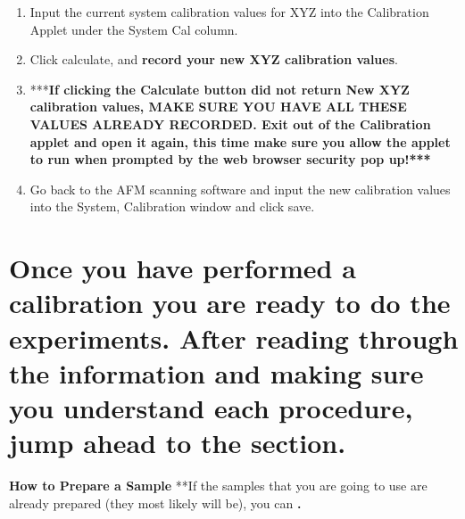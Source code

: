 \documentclass{../lab}
\begin{document}
\begin{enumerate}
\begin{itemize}
    \end{itemize}

    \item Input the current system calibration values for XYZ into the Calibration Applet under the System Cal column.

    \item Click calculate, and \textbf{record your new XYZ calibration values}.

    \item ***\textbf{If clicking the Calculate button did not return New XYZ calibration values, MAKE SURE YOU HAVE ALL THESE VALUES ALREADY RECORDED.  Exit out of the Calibration applet and open it again, this time make sure you allow the applet to run when prompted by the web browser security pop up!***}

    \item Go back to the AFM scanning software and input the new calibration values into the System, Calibration window and click save.

\end{enumerate}

\section{Once you have performed a calibration you are ready to do the experiments.  After reading through the information and making sure you understand each procedure, jump ahead to the  section.}

\textbf{How to Prepare a Sample}
**If the samples that you are going to use are already prepared (they most likely will be), you can \textbf{.}
\end{document}
